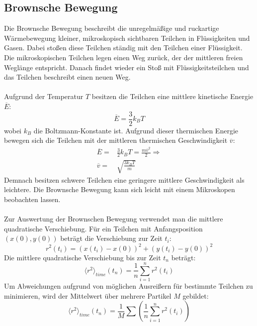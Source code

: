 \documentclass[a4paper,titlepage]{scrartcl}
\numberwithin{equation}{section}
\begin{document}
\subsection{Brownsche Bewegung}
Die Brownsche Bewegung beschreibt die unregelmäßige und ruckartige Wärmebewegung kleiner, mikroskopisch sichtbaren Teilchen in Flüssigkeiten und Gasen. Dabei stoßen diese Teilchen ständig mit den Teilchen einer Flüssigkeit. Die mikroskopischen Teilchen legen einen Weg zurück, der der mittleren freien Weglänge entspricht. Danach findet wieder ein Stoß mit Flüssigkeitsteilchen und das Teilchen beschreibt einen neuen Weg.\\ \\
Aufgrund der Temperatur $T$ besitzen die Teilchen eine mittlere kinetische Energie $\overline{E}$:
\begin{equation*}
\overline{E}=\frac{3}{2}k_BT
\end{equation*}
wobei $k_B$ die Boltzmann-Konstante ist. Aufgrund dieser thermischen Energie bewegen sich die Teilchen mit der mittleren thermischen Geschwindigkeit $\overline{v}$:
\begin{align*}
\overline{E}=&\frac{3}{2}k_BT=\frac{m\overline{v}^2}{2}\Rightarrow \\
\overline{v}=&\sqrt{\frac{3k_BT}{m}}
\end{align*}
Demnach besitzen schwere Teilchen eine geringere mittlere Geschwindigkeit als leichtere. Die Brownsche Bewegung kann sich leicht mit einem Mikroskopen beobachten lassen.\\ \\
Zur Auswertung der Brownschen Bewegung verwendet man die mittlere quadratische Verschiebung. Für ein Teilchen mit Anfangsposition $(x(0),y(0))$ beträgt die Verschiebung zur Zeit $t_i$:
\begin{equation}
\label{eq:verschiebungEinfach}
r^2(t_i)=(x(t_i)-x(0))^2+(y(t_i)-y(0))^2
\end{equation}
Die mittlere quadratische Verschiebung bis zur Zeit $t_n$ beträgt:
\begin{equation*}
\langle r^2 \rangle_{time}(t_n)=\frac{1}{n} \sum_{i=1}^{n} r^2(t_i)
\end{equation*}
Um Abweichungen aufgrund von möglichen Ausreißern für bestimmte Teilchen zu minimieren, wird der Mittelwert über mehrere Partikel $M$ gebildet:
\begin{equation}
\label{eq:verschiebung}
\langle r^2 \rangle_{time}(t_n)=\frac{1}{M} \sum\left( \frac{1}{n} \sum_{i=1}^{n} r^2(t_i) \right)
\end{equation}
\end{document}

